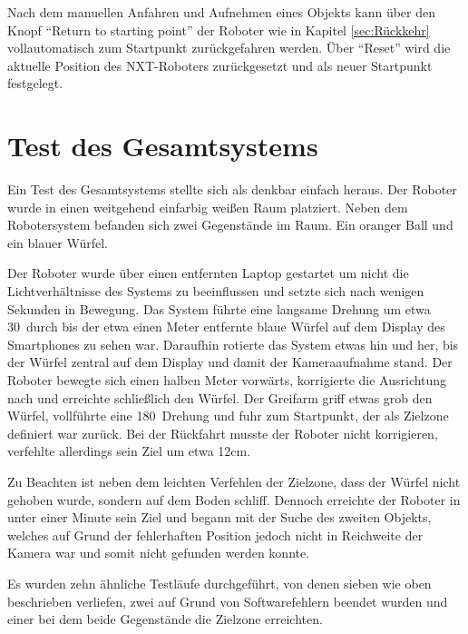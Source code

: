 Nach dem manuellen Anfahren und Aufnehmen eines Objekts kann über den Knopf \enquote{Return to starting point} der Roboter wie in Kapitel \ref{sec:Rückkehr} vollautomatisch zum Startpunkt zurückgefahren werden. Über \enquote{Reset} wird die aktuelle Position des NXT-Roboters zurückgesetzt und als neuer Startpunkt festgelegt.

\section{Test des Gesamtsystems}

Ein Test des Gesamtsystems stellte sich als denkbar einfach heraus. Der Roboter wurde in einen weitgehend einfarbig weißen Raum platziert. Neben dem Robotersystem befanden sich zwei Gegenstände im Raum. Ein oranger Ball und ein blauer Würfel.

Der Roboter wurde über einen entfernten Laptop gestartet um nicht die Lichtverhältnisse des Systems zu beeinflussen und setzte sich nach wenigen Sekunden in Bewegung. Das System führte eine langsame Drehung um etwa 30\degree\ durch bis der etwa einen Meter entfernte blaue Würfel auf dem Display des Smartphones zu sehen war. Daraufhin rotierte das System etwas hin und her, bis der Würfel zentral auf dem Display und damit der Kameraaufnahme stand. Der Roboter bewegte sich einen halben Meter vorwärts, korrigierte die Ausrichtung nach und erreichte schließlich den Würfel. Der Greifarm griff etwas grob den Würfel, vollführte eine 180\degree\ Drehung und fuhr zum Startpunkt, der als Zielzone definiert war zurück. Bei der Rückfahrt musste der Roboter nicht korrigieren, verfehlte allerdings sein Ziel um etwa 12cm. 

Zu Beachten ist neben dem leichten Verfehlen der Zielzone, dass der Würfel nicht gehoben wurde, sondern auf dem Boden schliff. Dennoch erreichte der Roboter in unter einer Minute sein Ziel und begann mit der Suche des zweiten Objekts, welches auf Grund der fehlerhaften Position jedoch nicht in Reichweite der Kamera war und somit nicht gefunden werden konnte.

Es wurden zehn ähnliche Testläufe durchgeführt, von denen sieben wie oben beschrieben verliefen, zwei auf Grund von Softwarefehlern beendet wurden und einer bei dem beide Gegenstände die Zielzone erreichten.